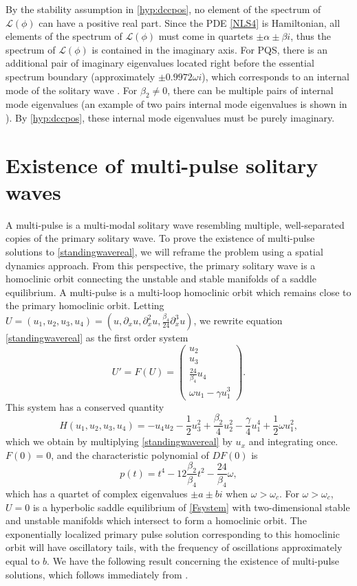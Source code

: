 \documentclass[12pt]{elsarticle}
\def\calL{{\mathcal L}}
\begin{document}
By the stability assumption in \cref{hyp:dccpos}, no element of the spectrum of $\calL(\phi)$ can have a positive real part. Since the PDE \cref{NLS4} is Hamiltonian, all elements of the spectrum of $\calL(\phi)$ must come in quartets $\pm \alpha \pm \beta i$, thus the spectrum of $\calL(\phi)$ is contained in the imaginary axis. For PQS, there is an additional pair of imaginary eigenvalues located right before the essential spectrum boundary (approximately $\pm 0.9972 \omega i$), which corresponds to an internal mode of the solitary wave \cite{Tam2019}. For $\beta_2 \neq 0$, there can be multiple pairs of internal mode eigenvalues (an example of two pairs internal mode eigenvalues is shown in \cite[Figure 9]{Tam2020}). By \cref{hyp:dccpos}, these internal mode eigenvalues must be purely imaginary.

\section{Existence of multi-pulse solitary waves}

A multi-pulse is a multi-modal solitary wave resembling multiple, well-separated copies of the primary solitary wave. To prove the existence of multi-pulse solutions to \cref{standingwavereal}, we will reframe the problem using a spatial dynamics approach. From this perspective, the primary solitary wave is a homoclinic orbit connecting the unstable and stable manifolds of a saddle equilibrium. A multi-pulse is a multi-loop homoclinic orbit which remains close to the primary homoclinic orbit. Letting $U = (u_1, u_2, u_3, u_4) = (u, \partial_x u, \partial_x^2 u, \frac{\beta_4}{24} \partial_x^3 u)$, we rewrite equation \cref{standingwavereal} as the first order system
\begin{equation}\label{Fsystem}
U' = F(U) = \begin{pmatrix}
u_2 \\ u_3 \\ \frac{24}{\beta_4} u_4 \\ \omega u_1 - \gamma u_1^3
\end{pmatrix}.
\end{equation}
This system has a conserved quantity
\begin{equation}\label{FsystemH}
H(u_1, u_2, u_3, u_4) = -u_4 u_2 - \frac{1}{2} u_3^2 + \frac{\beta_2}{4}u_2^2 - \frac{\gamma}{4} u_1^4 + \frac{1}{2}\omega u_1^2,
\end{equation}
which we obtain by multiplying \cref{standingwavereal} by $u_x$ and integrating once. $F(0) = 0$, and the characteristic polynomial of $DF(0)$ is
\[
p(t) = t^4 - 12\frac{\beta_2}{\beta_4} t^2 - \frac{24}{\beta_4}\omega,
\]
which has a quartet of complex eigenvalues $\pm a \pm b i$ when $\omega > \omega_c$. For $\omega > \omega_c$, $U = 0$ is a hyperbolic saddle equilibrium of \cref{Fsystem} with two-dimensional stable and unstable manifolds which intersect to form a homoclinic orbit. The exponentially localized primary pulse solution corresponding to this homoclinic orbit will have oscillatory tails, with the frequency of oscillations approximately equal to $b$. We have the following result concerning the existence of multi-pulse solutions, which follows immediately from \cite[Theorem~3.6]{SandstedeStrut}. 
\end{document}
